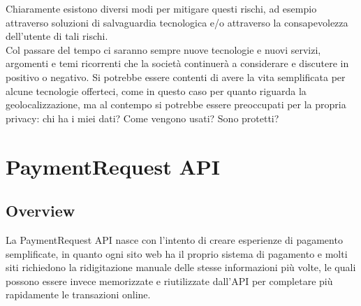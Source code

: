 \documentclass[11pt ,a4paper , twoside , openright ]{book}
\begin{document}
	Chiaramente esistono diversi modi per mitigare questi rischi, ad esempio attraverso soluzioni di salvaguardia tecnologica e/o attraverso la consapevolezza dell'utente di tali rischi.
	\\
	Col passare del tempo ci saranno sempre nuove tecnologie e nuovi servizi, argomenti e temi ricorrenti che la società continuerà a considerare e discutere in positivo o negativo.
	Si potrebbe essere contenti di avere la vita semplificata per alcune tecnologie offerteci, come in questo caso per quanto riguarda la geolocalizzazione, ma al contempo si potrebbe essere preoccupati per la propria privacy: chi ha i miei dati? Come vengono usati? Sono protetti?
	\cleardoublepage
	
	\chapter{PaymentRequest API}
	
	\section{Overview}
	La PaymentRequest API \cite{rif9} nasce con l'intento di creare esperienze di pagamento semplificate, in quanto ogni sito web ha il proprio sistema di pagamento e molti siti richiedono la ridigitazione manuale delle stesse informazioni più volte, le quali possono essere invece memorizzate e riutilizzate dall'API per completare più rapidamente le transazioni online.
	
\end{document}
